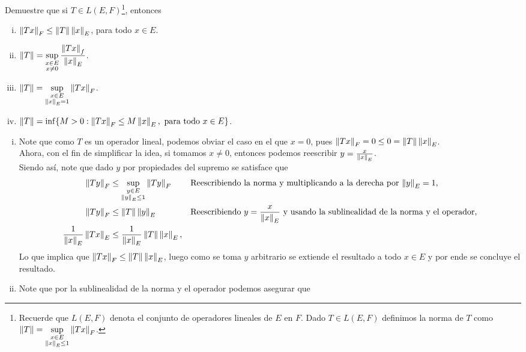 \begin{homeworkProblem}
  Demuestre que si $T\in L(E,F)$\footnote{Recuerde que $L(E,F)$ denota el conjunto de operadores lineales de $E$ en $F$. Dado $T\in L(E,F)$ definimos la norma de $T$ como $\displaystyle \left\|T\right\| = \sup_{\substack{x \in E \\ \left\|x\right\|_E \leq 1}} \left\|Tx\right\|_F$.}, entonces
  \begin{enumerate}[(i)]
    \item $\left\|Tx\right\|_{F}\leq \left\|T\right\|\left\|x\right\|_{E}$, para todo $x\in E$.
    \item $\displaystyle \left\|T\right\| = \sup_{\substack{x \in E \\ x\neq 0}} \frac{\left\|Tx\right\|_{f}}{\left\|x\right\|_{E}}$.
    \item $\displaystyle \left\|T\right\| = \sup_{\substack{x \in E \\ \left\|x\right\|_E = 1}} \left\|Tx\right\|_F$.
    \item $\left\|T\right\|=\inf\{M>0:\left\|Tx\right\|_{F}\leq M\left\|x\right\|_{E}, \text{ para todo }x\in E\}$.
  \end{enumerate}
  \begin{solution}
    \begin{enumerate}[(i)]
      \item Note que como $T$ es un operador lineal, podemos obviar el caso en el que $x=0$, pues $\left\|Tx\right\|_{F}=0\leq 0=\left\|T\right\|\left\|x\right\|_{E}$.\\
        Ahora, con el fin de simplificar la idea, si tomamos $x\neq 0$, entonces podemos reescribir $y=\frac{x}{\left\|x\right\|_{E}}$.\\
        Siendo así, note que dado $y$ por propiedades del supremo se satisface que
        \begin{align*}
          \left\|Ty\right\|_{F}&\leq \sup_{\substack{y\in E\\ \left\|y\right\|_{E}\leq 1}}\left\|Ty\right\|_{F} &&\text{Reescribiendo la norma y multiplicando a la derecha por $\left\|y\right\|_{E}=1$,}\\
          \left\|Ty\right\|_{F}&\leq \left\|T\right\|\left\|y\right\|_{E} &&\text{Reescribiendo $y=\frac{x}{\left\|x\right\|_{E}}$ y usando la sublinealidad de la norma y el operador,}\\
          \frac{1}{\left\|x\right\|_{E}}\left\|Tx\right\|_{E}&\leq \frac{1}{\left\|x\right\|_{E}}\left\|T\right\|\left\|x\right\|_{E},
        \end{align*}
        Lo que implica que $\left\|Tx\right\|_{F}\leq \left\|T\right\|\left\|x\right\|_{E}$, luego como se toma $y$ arbitrario se extiende el resultado a todo $x\in E$ y por ende se concluye el resultado.
      \item Note que por la sublinealidad de la norma y el operador podemos asegurar que

\end{enumerate}
\end{solution}
\end{homeworkProblem}
